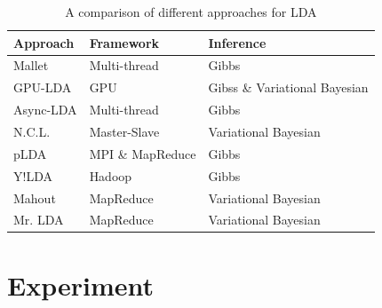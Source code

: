 \documentclass[conference]{IEEEtran}
\begin{document}
\begin{table}[!t]
\caption{A comparison of different approaches for LDA}
\label{lda_comp}
\centering
\begin{tabular}{lll}\hline
Approach  & Framework        & Inference                     \\ \hline
Mallet    & Multi-thread     & Gibbs                         \\
GPU-LDA   & GPU              & Gibss \& Variational Bayesian \\
Async-LDA & Multi-thread     & Gibbs                         \\
N.C.L.    & Master-Slave     & Variational Bayesian          \\
pLDA      & MPI \& MapReduce & Gibbs                         \\
Y!LDA     & Hadoop           & Gibbs                         \\
Mahout    & MapReduce        & Variational Bayesian          \\
Mr. LDA   & MapReduce        & Variational Bayesian         \\\hline
\end{tabular}
\end{table}

\section{Experiment}
\end{document}
